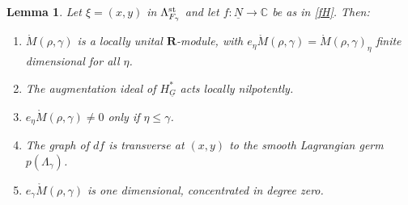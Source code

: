 \documentclass[11pt,reqno]{amsart}
\newtheorem{Lemma}[Theorem]{Lemma}
\theoremstyle{definition}
\theoremstyle{remark}
\def\dN{\underline N}
\def\dG{\underline G}
\def\bR{\mathbf R}
\begin{document}
\begin{Lemma}\label{lem:Morse}
Let $\xi=(x,y)$ in $\Lambda_{F_\gamma}^{\rm st}$ and let $f:\dN\to\mathbb C$ be as in \eqref{fH}.
Then:
\begin{enumerate}[label=$\mathrm{(\alph*)}$,leftmargin=8mm,itemsep=1mm]
\item $\mathring M(\rho,\gamma)$ is a locally unital $\bR$-module, with
$e_\eta \mathring M(\rho,\gamma)=\mathring M(\rho,\gamma)_\eta$ finite dimensional for all $\eta$.
\item
The augmentation ideal of $H^*_{\dG}$ acts locally nilpotently.
\item $e_\eta \mathring M(\rho,\gamma)\neq0$ only if $\eta\leqslant\gamma$.
\item The graph of $df$ is transverse at $(x,y)$ to the smooth 
Lagrangian germ $p(\Lambda_\gamma)$.
\item $e_\gamma \mathring M(\rho,\gamma)$ is one dimensional, concentrated in degree zero.
\end{enumerate}
\end{Lemma}
\end{document}
